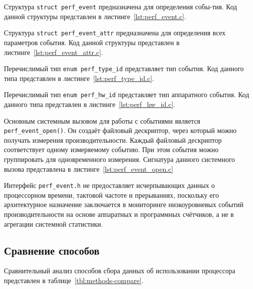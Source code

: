 Структура \texttt{struct perf\_event} предназначена для определения собы-тия. Код данной структуры представлен в листинге~\ref{lst:perf_event.c}.


Структура \texttt{struct perf\_event\_attr} предназначена для определения всех параметров события. Код данной структуры представлен в листинге~\ref{lst:perf_event_attr.c}.


Перечислимый тип \texttt{enum perf\_type\_id} представляет тип события. Код данного типа представлен в листинге~\ref{lst:perf_type_id.c}.

\newpage


Перечислимый тип \texttt{enum perf\_hw\_id} представляет тип аппаратного события. Код данного типа представлен в листинге~\ref{lst:perf_hw_id.c}.


Основным системным вызовом для работы с событиями является \texttt{perf\_event\_open()}. Он  создаёт   файловый   дескриптор,   через  который  можно  получать  измерения производительности. Каждый файловый дескриптор соответствует одному измеряемому  событию. При этом события можно группировать для одновременного измерения. Сигнатура данного системного вызова представлена в листинге~\ref{lst:perf_event_open.c}


Интерфейс \texttt{perf\_event.h} не предоставляет исчерпывающих данных о процессорном времени, тактовой частоте и прерываниях, поскольку его архитектурное назначение заключается в мониторинге низкоуровневых событий производительности на основе аппаратных и программных счётчиков, а не в агрегации системной статистики.

\subsection*{Сравнение способов}

Сравнительный анализ способов сбора данных об использовании процессора представлен в таблице~\ref{tbl:methods-compare}.

